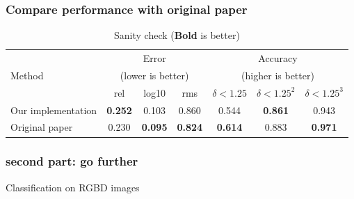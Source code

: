 \documentclass{beamer}
\begin{document}
\begin{frame}
\frametitle{Compare performance with original paper}
\begin{table} [t] \center
\resizebox{\linewidth}{!} {
\begin{tabular}{ | l |  c  c  c | c  c  c |}
\hline 
\multirow{3}{*}{{{Method}}} &\multicolumn{3}{c|}{Error} &\multicolumn{3}{c|}{Accuracy} \\
&\multicolumn{3}{c|}{(lower is better)} &\multicolumn{3}{c|}{(higher is better)} \\
\cline{2-7}
&rel &log10 &rms &$\delta < 1.25$ &$\delta < 1.25^2$ &$\delta < 1.25^3$  \\
\hline
%
%
Our implementation &\textbf{0.252}	 &0.103	  &0.860  	&0.544   	&\textbf{0.861}	&0.943  \\
Original paper    &0.230	 &\textbf{0.095} 	 &\textbf{0.824}  &\textbf{0.614} 	 &0.883	 &\textbf{0.971} \\
\hline
\end{tabular}
}
\caption{Sanity check (\textbf{Bold} is better)}
\end{table}
\end{frame}


\begin{frame}
\frametitle{second part: go further}
\Huge{\centerline{Classification on RGBD images}}
\end{frame}
\end{document}
